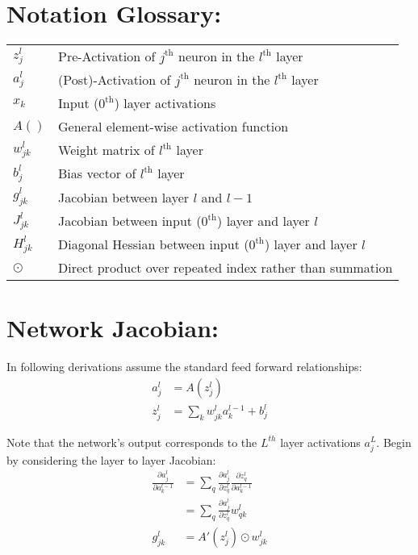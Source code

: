 \documentclass{article}
\begin{document}
\section*{Notation Glossary:}
\begin{tabular}{ll}
\(z_j^l\) & Pre-Activation of $j^{\text{th}}$ neuron in the $l^{\text{th}}$ layer \\[0.5em]
\(a_j^l\) & (Post)-Activation of $j^{\text{th}}$ neuron in the $l^{\text{th}}$ layer \\[0.5em]
\(x_k\) & Input ($0^{\text{th}}$) layer activations \\[0.5em]
$A()$ & General element-wise activation function \\[0.5em]
\(w_{jk}^l\) & Weight matrix of $l^{\text{th}}$ layer \\[0.5em]
\(b_j^l\) & Bias vector of $l^{\text{th}}$ layer \\[0.5em]
\(g_{jk}^l\) & Jacobian between layer \(l\) and \(l-1\) \\[0.5em]
\(J_{jk}^l\) & Jacobian between input ($0^{\text{th}}$) layer and layer \(l\) \\[0.5em]
\(H_{jk}^l\) & Diagonal Hessian between input ($0^{\text{th}}$) layer and layer \(l\) \\[0.5em]
\(\odot\) & Direct product over repeated index rather than summation \\[0.5em]
\end{tabular}

\section*{Network Jacobian:}
In following derivations assume the standard feed forward relationships:
\begin{align}
a_j^l &= A(z_j^l) \\
z_j^l &= \sum_k w_{jk}^la_k^{l-1} + b_j^l
\end{align}

Note that the network's output corresponds to the \(L^{th}\) layer activations \(a_j^L\). Begin by considering the layer to layer Jacobian:
\begin{align}
\frac{\partial a_j^l}{\partial a_k^{l-1}} &= \sum_q \frac{\partial a_j^l}{\partial z_q^l} \frac{\partial z_q^l}{\partial a_k^{l-1}} \\
&= \sum_q \frac{\partial a_j^l}{\partial z_q^l} w_{qk}^l \\
g_{jk}^l &= A'(z_j^l) \odot w_{jk}^l
\end{align}
\end{document}
